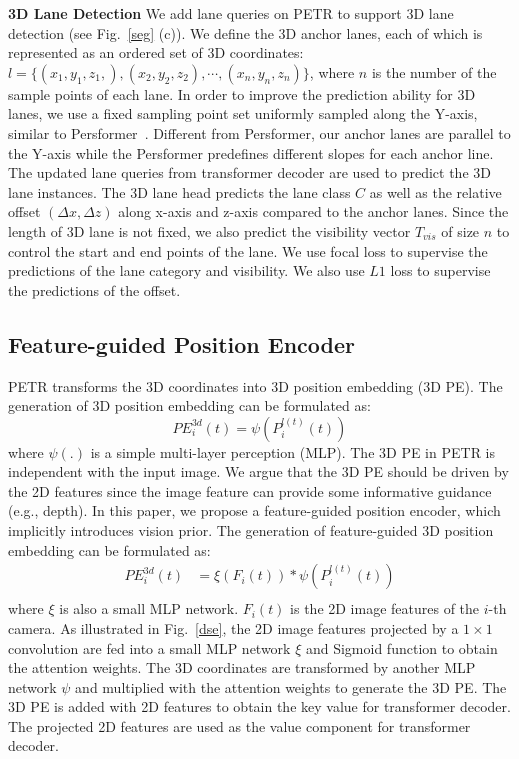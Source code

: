 \documentclass[10pt,twocolumn,letterpaper]{article}
\begin{document}
\noindent \textbf{3D Lane Detection}
We add lane queries on PETR to support 3D lane detection (see Fig.~\ref{seg} (c)). We define the 3D anchor lanes, each of which is represented as an ordered set of 3D coordinates: $l=\{(x_1,y_1,z_1,),(x_2,y_2,z_2), \cdots , (x_n,y_n,z_n) \}$, where $n$ is the number of the sample points of each lane. In order to improve the prediction ability for 3D lanes, we use a fixed sampling point set uniformly sampled along the Y-axis, similar to Persformer~\cite{chen2022persformer}. 
Different from Persformer, our anchor lanes are parallel to the Y-axis while the Persformer predefines different slopes for each anchor line. The updated lane queries from transformer decoder are used to predict the 3D lane instances. The 3D lane head predicts the lane class $C$ as well as the relative offset $(\Delta x,\Delta z)$ along x-axis and z-axis compared to the anchor lanes. Since the length of 3D lane is not fixed, we also predict the visibility vector $T_{vis}$ of size $n$ to control the start and end points of the lane. We use focal loss to supervise the predictions of the lane category and visibility. We also use  $L1$ loss to supervise the predictions of the offset. 


\subsection{Feature-guided Position Encoder}
\label{sec:fpe}
PETR transforms the 3D coordinates into 3D position embedding (3D PE).
The generation of 3D position embedding can be formulated as:
\begin{equation}\label{petr_pe}
PE^{3d}_i(t) = \psi(P^{l(t)}_i(t))
\end{equation}
where $\psi(.)$ is a simple multi-layer perception (MLP). 
The 3D PE in PETR is independent with the input image. We argue that the 3D PE should be driven by the 2D features since the image feature can provide some informative guidance (e.g., depth).
In this paper, we propose a feature-guided position encoder, which implicitly introduces vision prior. 
The generation of feature-guided 3D position embedding can be formulated as:
\begin{equation}\label{fpe}
\begin{split}
PE^{3d}_i(t) &= \xi(F_i(t)) \ast \psi(P^{l(t)}_i(t)) \\
\end{split}
\end{equation}
where $\xi$ is also a small MLP network. $F_{i}(t)$ is the 2D image features of the $i$-th camera. As illustrated in Fig.~\ref{dse}, the 2D image features projected by a $1\times1$ convolution are fed into a small MLP network $\xi$ and Sigmoid function to obtain the attention weights. The 3D coordinates are transformed by another MLP network $\psi$ and multiplied with the attention weights to generate the 3D PE. The 3D PE is added with 2D features to obtain the key value for transformer decoder. The projected 2D features are used as the value component for transformer decoder.
\end{document}
